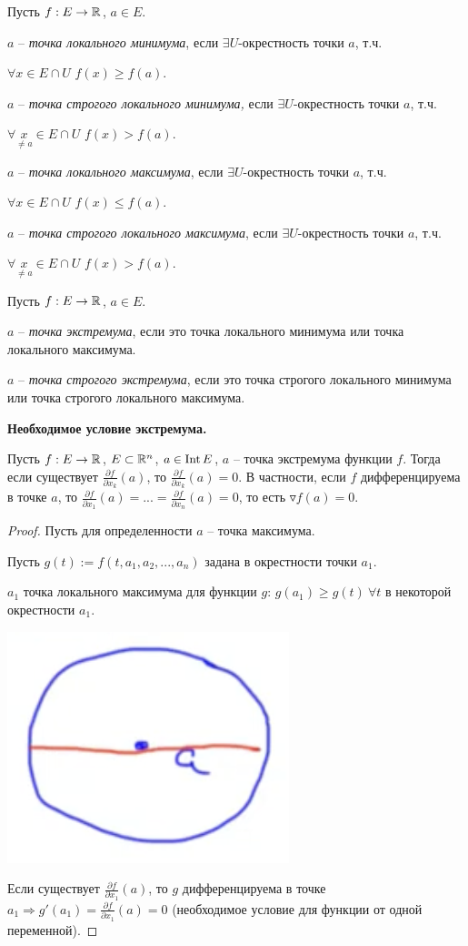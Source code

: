 \begin{definition}
    Пусть $f: E\rightarrow \mathbb{R}$, $a\in E$. 
    
    $a$ – \textit{точка локального минимума}, если $\exists U$-окрестность точки $a$, т.ч. 
    
    $\forall x\in E\cap U$ $f(x)\geq f(a)$.

    $a$ – \textit{точка строгого локального минимума,} если $\exists U$-окрестность точки $a$, т.ч.
    
    $\forall \underset{\neq a}{x}\in E\cap U$ $f(x)> f(a)$.

    $a$ – \textit{точка локального максимума}, если $\exists U$-окрестность точки $a$, т.ч.
    
    $\forall x\in E\cap U$ $f(x)\leq f(a)$.

    $a$ – \textit{точка строгого локального максимума}, если $\exists U$-окрестность точки $a$, т.ч.
    
    $\forall \underset{\neq a}{x}\in E\cap U$ $f(x)> f(a)$.
\end{definition}

\begin{definition}
    Пусть $f: E\rightarrow \mathbb{R}$, $a\in E$. 

    $a$ – \textit{точка экстремума}, если это точка локального минимума или точка локального максимума.

    $a$ – \textit{точка строгого экстремума}, если это точка строгого локального минимума или точка строгого локального максимума.
\end{definition}

\begin{theorem}
    \textbf{Необходимое условие экстремума.}

    Пусть $f: E\rightarrow \mathbb{R}$, $E\subset \mathbb{R}^n$, $a\in \operatorname{Int} E$, $a$ – точка экстремума функции $f$. Тогда если существует $\frac{\partial f}{\partial x_k}(a)$, то $\frac{\partial f}{\partial x_k}(a)=0$. В частности, если $f$ дифференцируема в точке $a$, то $\frac{\partial f}{\partial x_1}(a)=...=\frac{\partial f}{\partial x_n}(a)=0$, то есть $\triangledown f(a)=0$.
\end{theorem}

\begin{proof}
    Пусть для определенности $a$ – точка максимума.

    Пусть $g(t) := f(t, a_1, a_2, ..., a_n)$ задана в окрестности точки $a_1$.

    $a_1$ точка локального максимума для функции $g$: $g(a_1)\geq g(t)\ \forall t$ в некоторой окрестности $a_1$.

    \includegraphics[width=0.1\linewidth]{images/07-06-2.png}

    Если существует $\frac{\partial f}{\partial x_1}(a)$, то $g$ дифференцируема в точке $a_1\Rightarrow g'(a_1)=\frac{\partial f}{\partial x_1}(a)=0$ (необходимое условие для функции от одной переменной).
\end{proof}

